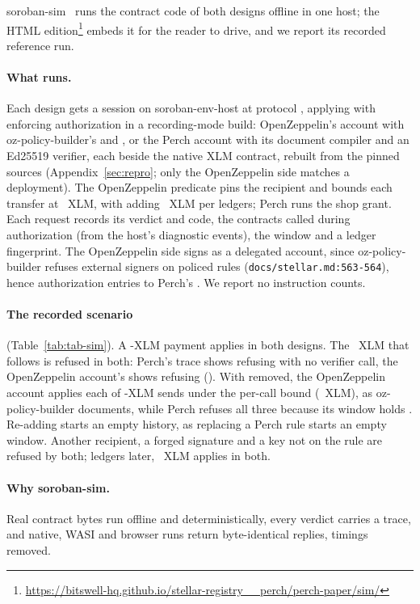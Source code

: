 soroban-sim~ runs the contract code of both designs
offline in one host; the HTML edition\ifdefined\anonymous\else\footnote{\url{https://bitswell-hq.github.io/stellar-registry__perch/perch-paper/sim/}}\fi{}
embeds it for the reader to drive, and we report its recorded reference run.

\paragraph{What runs.} Each design gets a session on soroban-env-host
 at protocol , applying with enforcing authorization in a
recording-mode build: OpenZeppelin's  account with
oz-policy-builder's  and , or the
Perch account with its document compiler and an Ed25519 verifier, each beside
the native XLM contract, rebuilt from the pinned sources (Appendix~\ref{sec:repro}; only the
OpenZeppelin side matches a deployment). The OpenZeppelin predicate pins the
recipient and bounds each transfer at ~XLM, with
 adding ~XLM per
 ledgers; Perch runs the shop grant. Each request
records its verdict and code, the contracts called during authorization (from
the host's diagnostic events), the window and a ledger fingerprint. The
OpenZeppelin side signs as a delegated account, since oz-policy-builder refuses
external signers on policed rules (\nolinkurl{docs/stellar.md:563-564}), hence
 authorization entries to Perch's .
We report no instruction counts.

\paragraph{The recorded scenario} (Table~\ref{tab:tab-sim}). A -XLM payment applies in both designs. The
~XLM that follows is refused in both: Perch's trace shows 
refusing with no verifier call, the OpenZeppelin account's shows
 refusing (). With
 removed, the OpenZeppelin account applies each of
 -XLM sends under the per-call bound
(~XLM), as oz-policy-builder documents, while
Perch refuses all three because its window holds .
Re-adding  starts an empty history, as replacing
a Perch rule starts an empty window. Another recipient, a forged signature and
a key not on the rule are refused by both;  ledgers
later, ~XLM applies in both.


\paragraph{Why soroban-sim.} Real contract bytes run offline and
deterministically, every verdict carries a trace, and native, WASI and browser
runs return byte-identical replies, timings removed.
